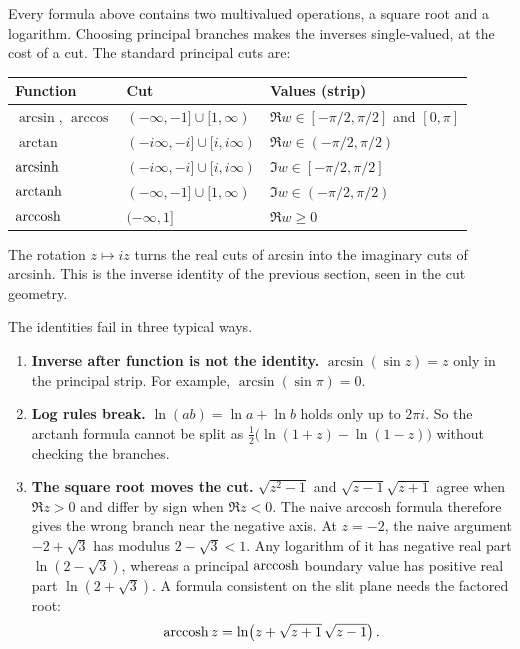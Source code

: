 \documentclass{essay}
\begin{document}
Every formula above contains two multivalued operations, a square root and a
logarithm. Choosing principal branches makes the inverses single-valued, at the
cost of a cut. The standard principal cuts are:
\begin{center}
\begin{tabular}{lll}
\toprule
Function & Cut & Values (strip) \\
\midrule
$\arcsin$, $\arccos$ & $(-\infty, -1] \cup [1, \infty)$
  & $\Re w \in [-\pi/2, \pi/2]$ and $[0, \pi]$ \\
$\arctan$ & $(-i\infty, -i] \cup [i, i\infty)$
  & $\Re w \in (-\pi/2, \pi/2)$ \\
$\operatorname{arcsinh}$ & $(-i\infty, -i] \cup [i, i\infty)$
  & $\Im w \in [-\pi/2, \pi/2]$ \\
$\operatorname{arctanh}$ & $(-\infty, -1] \cup [1, \infty)$
  & $\Im w \in (-\pi/2, \pi/2)$ \\
$\operatorname{arccosh}$ & $(-\infty, 1]$ & $\Re w \ge 0$ \\
\bottomrule
\end{tabular}
\end{center}
The rotation $z \mapsto iz$ turns the real cuts of arcsin into the imaginary
cuts of arcsinh. This is the inverse identity of the previous section, seen in
the cut geometry.

The identities fail in three typical ways.
\begin{enumerate}
  \item \textbf{Inverse after function is not the identity.}
    $\arcsin(\sin z) = z$ only in the principal strip. For example,
    $\arcsin(\sin \pi) = 0$.
  \item \textbf{Log rules break.}
    $\ln(ab) = \ln a + \ln b$ holds only up to $2\pi i$. So the arctanh formula
    cannot be split as $\tfrac{1}{2}\bigl(\ln(1+z) - \ln(1-z)\bigr)$ without
    checking the branches.
  \item \textbf{The square root moves the cut.}
    $\sqrt{z^2 - 1}$ and $\sqrt{z-1}\sqrt{z+1}$ agree when $\Re z > 0$ and
    differ by sign when $\Re z < 0$. The naive arccosh formula therefore gives
    the wrong branch near the negative axis. At $z=-2$, the naive argument
    $-2+\sqrt3$ has modulus $2-\sqrt3<1$. Any logarithm of it has negative
    real part $\ln(2-\sqrt3)$, whereas a principal $\operatorname{arccosh}$ boundary value
    has positive real part $\ln(2+\sqrt3)$. A formula consistent on the
    slit plane needs the factored root:
    \[
      \operatorname{arccosh} z = \ln\!\left( z + \sqrt{z + 1}\,\sqrt{z - 1} \right).
    \]
\end{enumerate}
\end{document}
